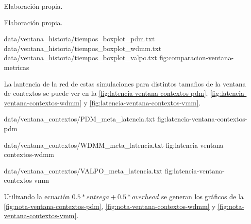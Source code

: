 {Elaboración propia.}



{Elaboración propia.}


{
\boxplotTiempos
{data/ventana_historia/tiempos_boxplot_pdm.txt}
{data/ventana_historia/tiempos_boxplot_wdmm.txt}
{data/ventana_historia/tiempos_boxplot_valpo.txt}
}{fig:comparacion-ventana-metricas}





La lantencia de la red de estas simulaciones para distintos tamaños de la
ventana de contextos se puede ver en la
\ref{fig:latencia-ventana-contextos-pdm},
\ref{fig:latencia-ventana-contextos-wdmm} y
\ref{fig:latencia-ventana-contextos-vmm}.


{
{data/ventana_contextos/PDM_meta_latencia.txt}
}{fig:latencia-ventana-contextos-pdm}

{
{data/ventana_contextos/WDMM_meta_latencia.txt}
}{fig:latencia-ventana-contextos-wdmm}

 {
{data/ventana_contextos/VALPO_meta_latencia.txt}
}{fig:latencia-ventana-contextos-vmm}



Utilizando la ecuación $0.5*entrega + 0.5*overhead$ se generan los gráficos de
la \ref{fig:nota-ventana-contextos-pdm}, \ref{fig:nota-ventana-contextos-wdmm} y
\ref{fig:nota-ventana-contextos-vmm}.  





